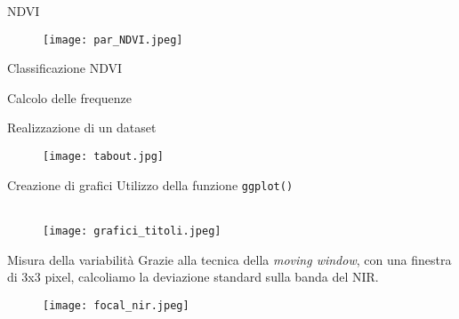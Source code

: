 \documentclass{beamer} %
\begin{document}
        
\begin{frame}{NDVI}

\begin{figure}
    \centering
    \texttt{[image: par\_NDVI.jpeg]}
\end{figure}
 \end{frame}
 
\begin{frame}{Classificazione NDVI}
    
\end{frame}

\begin{frame}{Calcolo delle frequenze}
     
\end{frame}

\begin{frame}{Realizzazione di un dataset}
     
    \begin{figure}
        \centering
        \texttt{[image: tabout.jpg]}
    \end{figure}
\end{frame}

\begin{frame}{Creazione di grafici}
Utilizzo della funzione \texttt{ggplot()}
\\
\\
    \begin{figure}
        \centering
        \texttt{[image: grafici\_titoli.jpeg]}
    \end{figure}
\end{frame}

\begin{frame}{Misura della variabilità}
Grazie alla tecnica della \textit{moving window}, con una finestra di 3x3 pixel, calcoliamo
la deviazione standard sulla banda del NIR.
\bigskip
    
    \begin{figure}
        \centering
        \texttt{[image: focal\_nir.jpeg]}
    \end{figure}
\end{frame}
\end{document}
